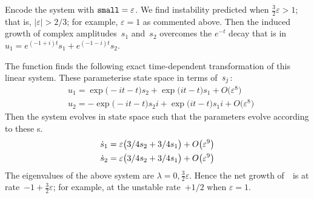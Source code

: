 Encode the system with \(\verb|small|=\varepsilon\).  We
find instability predicted when \(\tfrac32\varepsilon
>1\); that is, \(|\varepsilon|>2/3\); for example,
\(\varepsilon=1\) as commented above.  Then the induced
growth of complex amplitudes~\(s_1\) and~\(s_2\) overcomes
the \(e^{-t}\) decay that is in \(u_1 = e^{(-1+i)t}s_1 +
e^{(-1-i)t}s_2\).
The function finds the following exact time-dependent
transformation of this linear system. These parameterise
state space in terms of~\(s\sb j\):
\begin{align*}&
u_{1}=\exp \big(-i t-t\big) s_{2}+\exp \big(i t-t\big) s_{1}+O\big(
\varepsilon ^{8}\big)
\\&
u_{2}=-\exp \big(-i t-t\big) s_{2} i+\exp \big(i t-t\big) s_{1} i+O\big(
\varepsilon ^{8}\big)
\end{align*}
Then the system evolves in state space such that the
parameters evolve according to these \ode{}s.
\begin{align*}&
\dot s_{1}=\varepsilon \big(3/4 s_{2}+3/4 s_{1}\big)+O\big(\varepsilon ^{9}
\big)
\\&
\dot s_{2}=\varepsilon \big(3/4 s_{2}+3/4 s_{1}\big)+O\big(\varepsilon ^{9}\big)
\end{align*}
The eigenvalues of the above system are \(\lambda =0,
\tfrac32\varepsilon\).  Hence the net growth of~\uv\ is at
rate~\(-1+\tfrac32\varepsilon\); for example, at the
unstable rate~\(+1/2\) when \(\varepsilon=1\).


